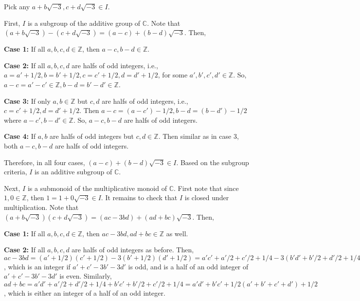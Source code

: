 \documentclass[12pt]{article}
\begin{document}
\newpage

\begin{fproof}[Jacobson 2.1.4]
  Pick any \(a + b \sqrt{-3}, c + d \sqrt{-3} \in I\).

  First, \(I\) is a subgroup of the additive group of \(\mathbb{C}\).
  Note that\((a + b \sqrt{-3}) - (c + d \sqrt{-3}) = (a-c) + (b-d) \sqrt{-3}\).
  Then,

  \textbf{Case 1:} If all \(a,b,c,d \in \mathbb{Z}\), then \(a-c, b-d \in \mathbb{Z}\).

  \textbf{Case 2:} If all \(a,b,c,d\) are halfs of odd integers, i.e., \(a = a' + 1/2, b = b' + 1/2, c = c' + 1/2, d = d' + 1/2\), for some \(a',b',c',d' \in \mathbb{Z}\).
  So, \(a-c = a'-c' \in \mathbb{Z}, b-d = b'-d' \in \mathbb{Z}\).

  \textbf{Case 3:} If only \(a,b \in \mathbb{Z}\) but \(c,d\) are halfs of odd integers, i.e., \(c = c' + 1/2, d = d' + 1/2\).
  Then \(a-c = (a-c') - 1/2, b-d = (b - d') - 1/2\) where \(a-c', b-d' \in \mathbb{Z}\). So, \(a-c, b-d\) are halfs of odd integers.

  \textbf{Case 4:} If \(a,b\) are halfs of odd integers but \(c,d \in \mathbb{Z}\). Then similar as in case 3, both \(a-c, b-d\) are halfs of odd integers.

  Therefore, in all four cases, \((a-c) + (b-d) \sqrt{-3} \in I\). Based on the subgroup criteria, \(I\) is an additive subgroup of \(\mathbb{C}\).

  Next, \(I\) is a submonoid of the multiplicative monoid of \(\mathbb{C}\).
  First note that since \(1, 0 \in \mathbb{Z}\), then \(1 = 1 + 0 \sqrt{-3} \in I\). It remains to check that \(I\) is closed under multiplication.
  Note that \((a + b \sqrt{-3})(c + d \sqrt{-3}) = (ac - 3bd) + (ad + bc) \sqrt{-3}\). Then,

  \textbf{Case 1:} If all \(a,b,c,d \in \mathbb{Z}\), then \(ac-3bd, ad+bc \in \mathbb{Z}\) as well.

  \textbf{Case 2:} If all \(a,b,c,d\) are halfs of odd integers as before. Then,
  \(ac - 3bd = (a' + 1/2)(c' + 1/2) - 3(b'+1/2)(d'+1/2) = a'c' + a'/2 + c'/2 + 1/4 - 3(b'd' + b'/2 + d'/2 + 1/4) = a'c'- 3b'd' + 1/2(a' + c' -3b' - 3d') - 1/2\), which is an integer if \(a' + c' -3b' - 3d'\) is odd, and is a half of an odd integer of \(a' + c' -3b' - 3d'\) is even. Similarly, \(ad + bc = a'd' + a'/2 + d'/2 + 1/4 + b'c' + b'/2 + c'/2 + 1/4 = a'd' + b'c' + 1/2(a' + b' + c' + d') + 1/2\), which is either an integer of a half of an odd integer.


\end{fproof}
\end{document}
